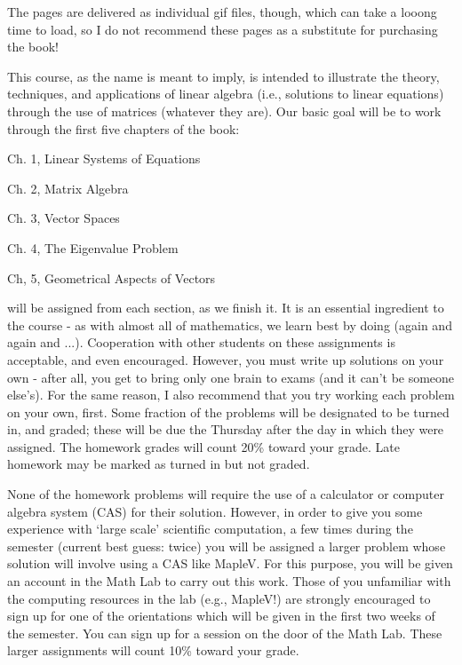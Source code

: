 \ni The pages are delivered as individual gif files, though, which
can take a looong time to load, so I do not recommend these
pages as a substitute for purchasing the book!

\msk

\ni This course, as the name is meant to imply, is intended to illustrate the 
theory, techniques, and applications of linear algebra (i.e., solutions to linear 
equations) through
the use of matrices (whatever they are).
Our basic goal will be to work through the first five chapters of the book:

\ssk

\ni\hsk Ch. 1, Linear Systems of Equations

\ni\hsk Ch. 2, Matrix Algebra

\ni\hsk Ch. 3, Vector Spaces

\ni\hsk Ch. 4, The Eigenvalue Problem

\ni\hsk Ch, 5, Geometrical Aspects of Vectors

\msk

 will be assigned from each section, as we finish it. 
It is an essential ingredient to the course - as with almost all of 
mathematics, we learn best by doing (again and again and ...). Cooperation 
with other students on these assignments is acceptable, and even 
encouraged. However, you must write up solutions on your own - after 
all, you get to bring only one brain to exams (and it can't be someone 
else's). For the same reason, I also recommend that you try working 
each problem on your own, first. Some fraction of the problems will be 
designated to be turned in, and graded; these will be due the Thursday 
after the day in which they were assigned. The homework grades will 
count 20\% toward your grade.
Late homework may be marked as turned in but not graded.

\ssk

\ni None of the homework problems will require the use of a calculator or computer
algebra system (CAS) for their solution. However, in order to give you some 
experience with `large scale' scientific computation, a few times during the semester
(current best guess: twice) you will be assigned a larger problem whose solution
will involve using a CAS like MapleV. For this purpose, you will be given an account
in the Math Lab to carry out this work. Those of you unfamiliar with the computing 
resources in the lab (e.g., MapleV!) are strongly encouraged to sign up for one 
of the orientations
which will be given in the first two weeks of the semester. You can sign up for a session
on the door of the Math Lab. These larger assignments will count 10\% toward your grade.

